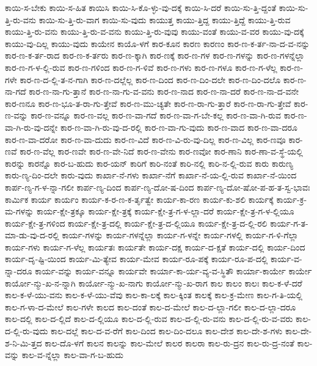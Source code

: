 {ಕಾಯಿ-ಸ-ಬೇಕು
ಕಾಯಿ-ಸ-ಹಿತ
ಕಾಯಿಸಿ
ಕಾಯಿ-ಸಿ-ಕೊ-ಳ್ಳು-ವು-ದಕ್ಕೆ
ಕಾಯಿ-ಸಿ-ದರೆ
ಕಾಯಿ-ಸು-ತ್ತಿ-ದ್ದಂತೆ
ಕಾಯಿ-ಸು-ತ್ತಿ-ರು-ವನು
ಕಾಯಿ-ಸು-ತ್ತಿ-ರು-ವಾಗ
ಕಾಯಿ-ಸು-ವುದು
ಕಾಯುತ್ತ
ಕಾಯು-ತ್ತಿದ್ದ
ಕಾಯು-ತ್ತಿದ್ದೆ
ಕಾಯು-ತ್ತಿ-ರುವ
ಕಾಯು-ತ್ತಿ-ರು-ವನು
ಕಾಯು-ತ್ತಿ-ರು-ವ-ವನು
ಕಾಯು-ತ್ತಿ-ರು-ವುವು
ಕಾಯು-ವಂತೆ
ಕಾಯು-ವ-ವರ
ಕಾಯು-ವು-ದಕ್ಕೆ
ಕಾಯು-ವು-ದಿಲ್ಲ
ಕಾಯು-ವುದು
ಕಾಯೇನ
ಕಾಯೊ-ಳಗೆ
ಕಾರ-ಕೂನ
ಕಾರಣ
ಕಾರಣಂ
ಕಾರ-ಣ-ಕ-ರ್ತ-ನಾ-ದ-ವ-ನನ್ನು
ಕಾರ-ಣ-ಕ-ರ್ತ-ರಾದ
ಕಾರ-ಣ-ಕ-ರ್ತರು
ಕಾರ-ಣ-ಕ್ಕಾಗಿ
ಕಾರ-ಣಕ್ಕೆ
ಕಾರ-ಣ-ಗಳ
ಕಾರ-ಣ-ಗಳನ್ನು
ಕಾರ-ಣ-ಗಳನ್ನೆಲ್ಲಾ
ಕಾರ-ಣ-ಗ-ಳ-ಲ್ಲಿ-ರುವ
ಕಾರ-ಣ-ಗಳಿಂದ
ಕಾರ-ಣ-ಗ-ಳಿವೆ
ಕಾರ-ಣ-ಗಳು
ಕಾರ-ಣ-ಗಳೂ
ಕಾರ-ಣ-ಗ-ಳೆಲ್ಲ
ಕಾರ-ಣ-ಗಳೇ
ಕಾರ-ಣ-ದ-ಲ್ಲಿ-ತ-ನ-ಗಾಗಿ
ಕಾರ-ಣ-ದಲ್ಲೆಲ್ಲ
ಕಾರ-ಣ-ದಿಂದ
ಕಾರ-ಣ-ದಿಂ-ದಲೇ
ಕಾರ-ಣ-ದಿಂ-ದಲೊ
ಕಾರ-ಣ-ನಾ-ಗದೆ
ಕಾರ-ಣ-ನಾ-ಗು-ತ್ತಾನೆ
ಕಾರ-ಣ-ನಾ-ಗು-ವ-ವನು
ಕಾರ-ಣ-ನಾದ
ಕಾರ-ಣ-ನಾ-ದರೆ
ಕಾರ-ಣ-ನಾ-ದ-ವನೇ
ಕಾರ-ಣನೂ
ಕಾರ-ಣ-ಭೂ-ತ-ರಾ-ಗು-ತ್ತೇವೆ
ಕಾರ-ಣ-ಮು-ಚ್ಯತೇ
ಕಾರ-ಣ-ರಾ-ಗು-ತ್ತಾರೆ
ಕಾರ-ಣ-ರಾ-ಗು-ತ್ತೇವೆ
ಕಾರ-ಣ-ವನ್ನು
ಕಾರ-ಣ-ವನ್ನೂ
ಕಾರ-ಣ-ವಲ್ಲ
ಕಾರ-ಣ-ವಾ-ಗದೆ
ಕಾರ-ಣ-ವಾ-ಗ-ಬೇ-ಕಲ್ಲ
ಕಾರ-ಣ-ವಾ-ಗಿ-ರುವ
ಕಾರ-ಣ-ವಾ-ಗಿ-ರು-ವು-ದನ್ನೇ
ಕಾರ-ಣ-ವಾ-ಗಿ-ರು-ವು-ದ-ರಲ್ಲಿ
ಕಾರ-ಣ-ವಾ-ಗು-ವುದು
ಕಾರ-ಣ-ವಾದ
ಕಾರ-ಣ-ವಾ-ದರೂ
ಕಾರ-ಣ-ವಾ-ದರೋ
ಕಾರ-ಣ-ವಾ-ದುದು
ಕಾರ-ಣ-ವಿದೆ
ಕಾರ-ಣ-ವಿ-ರು-ವು-ದಿಲ್ಲ
ಕಾರ-ಣ-ವಿಲ್ಲ
ಕಾರ-ಣವೂ
ಕಾರ-ಣವೆ
ಕಾರ-ಣ-ವೆಲ್ಲ
ಕಾರ-ಣವೇ
ಕಾರ-ಣ-ವೇ-ನಿದೆ
ಕಾರ-ಣ-ವೇನು
ಕಾರ-ಣವೋ
ಕಾರ-ಣಾನಿ
ಕಾರ-ಣಾ-ವ-ಸ್ಥೆ-ಯಲ್ಲಿ
ಕಾರನ್ನು
ಕಾರನ್ನೊ
ಕಾರ-ಬ-ಹುದು
ಕಾರ-ಯನ್
ಕಾರಿಗೆ
ಕಾರಿ-ನಂತೆ
ಕಾರಿ-ನಲ್ಲಿ
ಕಾರಿ-ನ-ಲ್ಲಿ-ರುವ
ಕಾರು
ಕಾರುಣ್ಯ
ಕಾರು-ಣ್ಯ-ದಿಂ-ದಲೇ
ಕಾರು-ವುದು
ಕಾರ್ಖಾ-ನೆ-ಗಳು
ಕಾರ್ಖಾ-ನೆಗೆ
ಕಾರ್ಖಾ-ನೆ-ಯ-ಲ್ಲಿ-ರುವ
ಕಾರ್ಖಾ-ನೆ-ಯಿಂದ
ಕಾರ್ಪ-ಣ್ಯ-ಗ-ಳ-ನ್ನಾ-ಗಲೀ
ಕಾರ್ಪ-ಣ್ಯ-ದಿಂದ
ಕಾರ್ಪ-ಣ್ಯ-ದೋ-ಷ-ದಿಂದ
ಕಾರ್ಪ-ಣ್ಯ-ದೋ-ಷೋ-ಪ-ಹ-ತ-ಸ್ವ-ಭಾವಃ
ಕಾರ್ಮಿಕ
ಕಾರ್ಯ
ಕಾರ್ಯಂ
ಕಾರ್ಯ-ಕ-ರ-ಣ-ಕ-ರ್ತೃತ್ವೇ
ಕಾರ್ಯ-ಕಾ-ರಣ
ಕಾರ್ಯ-ಕು-ಶಲಿ
ಕಾರ್ಯಕ್ಕೆ
ಕಾರ್ಯ-ಕ್ರ-ಮ-ಗಳನ್ನು
ಕಾರ್ಯ-ಕ್ಷೇ-ತ್ರಕ್ಕೂ
ಕಾರ್ಯ-ಕ್ಷೇ-ತ್ರಕ್ಕೆ
ಕಾರ್ಯ-ಕ್ಷೇ-ತ್ರ-ಗ-ಳ-ಲ್ಲಾ-ದರೆ
ಕಾರ್ಯ-ಕ್ಷೇ-ತ್ರ-ಗ-ಳ-ಲ್ಲಿಯೂ
ಕಾರ್ಯ-ಕ್ಷೇ-ತ್ರ-ಗಳಿಂದ
ಕಾರ್ಯ-ಕ್ಷೇ-ತ್ರ-ದಲ್ಲಿ
ಕಾರ್ಯ-ಕ್ಷೇ-ತ್ರ-ದ-ಲ್ಲಿಯೂ
ಕಾರ್ಯ-ಕ್ಷೇ-ತ್ರ-ದ-ಲ್ಲಿ-ರಲಿ
ಕಾರ್ಯ-ಗ-ತ-ಮಾ-ಡು-ವು-ದ-ರಲ್ಲಿ
ಕಾರ್ಯ-ಗಳನ್ನು
ಕಾರ್ಯ-ಗಳನ್ನೆಲ್ಲಾ
ಕಾರ್ಯ-ಗ-ಳನ್ನೇ
ಕಾರ್ಯ-ಗಳಲ್ಲಿ
ಕಾರ್ಯ-ಗ-ಳಿ-ಗೆಲ್ಲಾ
ಕಾರ್ಯ-ಗಳು
ಕಾರ್ಯ-ಗ-ಳೆಲ್ಲ
ಕಾರ್ಯತಃ
ಕಾರ್ಯತೇ
ಕಾರ್ಯ-ದಕ್ಷ
ಕಾರ್ಯ-ದ-ಕ್ಷತೆ
ಕಾರ್ಯ-ದಲ್ಲಿ
ಕಾರ್ಯ-ದಿಂದ
ಕಾರ್ಯ-ದೃ-ಷ್ಟಿ-ಯಿಂದ
ಕಾರ್ಯ-ಮಿ-ತ್ಯೇವ
ಕಾರ್ಯ-ಮೇವ
ಕಾರ್ಯ-ರೂ-ಪಕ್ಕೆ
ಕಾರ್ಯ-ರೂ-ಪ-ದಲ್ಲಿ
ಕಾರ್ಯ-ವ-ನ್ನಾ-ದರೂ
ಕಾರ್ಯ-ವನ್ನು
ಕಾರ್ಯ-ವನ್ನೂ
ಕಾರ್ಯವೇ
ಕಾರ್ಯಾ-ಕಾ-ರ್ಯ-ವ್ಯ-ವ-ಸ್ಥಿತೌ
ಕಾರ್ಯಾ-ಕಾರ್ಯೇ
ಕಾರ್ಯೇ
ಕಾರ್ಯೋ-ನ್ಮು-ಖ-ನ-ನ್ನಾಗಿ
ಕಾರ್ಯೋ-ನ್ಮು-ಖ-ನಾಗು
ಕಾರ್ಯೋ-ನ್ಮು-ಖ-ರಾಗ
ಕಾಲ
ಕಾಲಂ
ಕಾಲಃ
ಕಾಲ-ಕ-ಳೆ-ದರೆ
ಕಾಲ-ಕ-ಳೆ-ಯು-ವನು
ಕಾಲ-ಕ-ಳೆ-ಯು-ವೆವು
ಕಾಲ-ಕಾ-ಲಕ್ಕೆ
ಕಾಲ-ಕ್ಕಿಂತ
ಕಾಲಕ್ಕೆ
ಕಾಲ-ಕ್ರ-ಮೇಣ
ಕಾಲ-ಗ-ತಿ-ಯಲ್ಲಿ
ಕಾಲ-ಗ-ಳಾ-ದ-ಮೇಲೆ
ಕಾಲ-ಗಳೇ
ಕಾಲದ
ಕಾಲ-ದಂತೆ
ಕಾಲ-ದ-ಮೇಲೆ
ಕಾಲ-ದ-ಲ್ಲಾ-ಗಲೀ
ಕಾಲ-ದ-ಲ್ಲಾ-ದರೂ
ಕಾಲ-ದಲ್ಲಿ
ಕಾಲ-ದ-ಲ್ಲಿದೆ
ಕಾಲ-ದ-ಲ್ಲಿಯೂ
ಕಾಲ-ದ-ಲ್ಲಿ-ರುವ
ಕಾಲ-ದ-ಲ್ಲಿ-ರು-ವನು
ಕಾಲ-ದ-ಲ್ಲಿ-ರು-ವ-ವರು
ಕಾಲ-ದ-ಲ್ಲಿ-ರು-ವುದು
ಕಾಲ-ದಲ್ಲೆ
ಕಾಲ-ದ-ವ-ರೆಗೆ
ಕಾಲ-ದಿಂದ
ಕಾಲ-ದಿಂ-ದಲೂ
ಕಾಲ-ದೇಶ
ಕಾಲ-ದೇ-ಶ-ಗಳು
ಕಾಲ-ದೇ-ಶ-ನಿ-ಮಿ-ತ್ತದ
ಕಾಲ-ದೊ-ಳಗೆ
ಕಾಲನ
ಕಾಲನ್ನು
ಕಾಲ-ಮೇಲೆ
ಕಾಲರ
ಕಾಲರಾ
ಕಾಲ-ರು-ದ್ರನ
ಕಾಲ-ರು-ದ್ರ-ನಂತೆ
ಕಾಲ-ವನ್ನು
ಕಾಲ-ವ-ನ್ನೆಲ್ಲಾ
ಕಾಲ-ವಾ-ಗ-ಬ-ಹುದು
}
